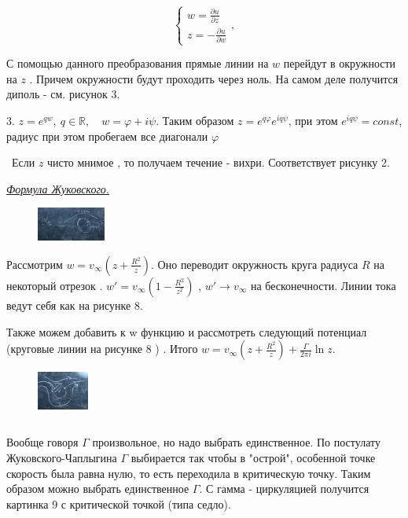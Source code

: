 $$ \begin{cases}
	w  = \frac{\partial u}{\partial z}\\
	z = -\frac{\partial u}{\partial w} 
\end{cases},$$

С помощью данного преобразования прямые линии на $w$ перейдут в окружности на $z$ . Причем окружности будут проходить через ноль. На самом деле получится диполь - см. рисунок 3.  

3. $z = e^{q w}, \ q \in \mathbb{R} , \quad w = \varphi + i \psi$. Таким образом $z = e^{q \varphi} e^{i q \psi}$, при этом $e^{i q \psi} = const$, радиус при этом пробегаем все диагонали $\varphi$

 Если $z$ чисто мнимое , то получаем течение - вихри. Соответствует рисунку 2.

\begin{center}
	\textit{\underline{Формула Жуковского.}}
\end{center}

\begin{figure}
	\includegraphics[width=0.2\textwidth]{14/pic_8.png}
	\caption{\label{ris:image14.8}}
\end{figure}

Рассмотрим $w=v_{\infty}(z + \frac{R^2}{z})$. Оно переводит окружность круга радиуса $R$ на некоторый отрезок . $w' = v_{\infty} ( 1 -  \frac{R^2}{z^2})$ , $w' \rightarrow v_{\infty} $ на бесконечности. Линии тока ведут себя как на рисунке 8. 

Также можем добавить к w функцию и рассмотреть следующий потенциал (круговые линии на рисунке 8 ) . Итого $w = v_{\infty}(z + \frac{R^2}{z}) + \frac{\Gamma}{2 \pi i} \ln z$. 

\begin{figure}
	\includegraphics[width=0.15\textwidth]{14/pic_9.png}
	\caption{\label{ris:image14.9}}
\end{figure}
$$ $$

Вообще говоря $\Gamma$ произвольное, но надо выбрать единственное. По постулату Жуковского-Чаплыгина $\Gamma$ выбирается так чтобы в "острой", особенной точке скорость была равна нулю, то есть переходила в критическую точку. Таким образом можно выбрать единственное $\Gamma$. С гамма - циркуляцией получится картинка 9 с критической точкой (типа седло).

